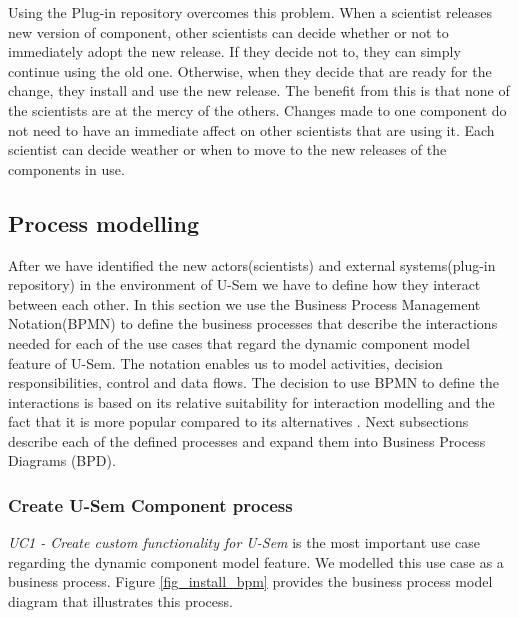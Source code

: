 Using the Plug-in repository overcomes this problem. When a scientist releases new version of component, other scientists can decide whether or not to immediately adopt the new release. If they decide not to, they can simply continue using the old one. Otherwise, when they decide that are ready for the change, they install and use the new release. The benefit from this is that none of the scientists are at the mercy of the others. Changes made to one component do not need to have an immediate affect on other scientists that are using it. Each scientist can decide weather or when to move to the new releases of the components in use.


\subsection{Process modelling}

After we have identified the new actors(scientists) and external systems(plug-in repository) in the environment of U-Sem we have to define how they interact between each other. In this section we use the Business Process Management Notation(BPMN) \cite{BPMN} to define the business processes that describe the interactions needed for each of the use cases that regard the dynamic component model feature of U-Sem. The notation enables us to model activities, decision responsibilities, control and data flows. The decision to use BPMN to define the interactions is based on its relative suitability for interaction modelling and the fact that it is more popular compared to its alternatives \cite{Decker}. Next subsections describe each of the defined processes and expand them into Business Process Diagrams (BPD).

\subsubsection{Create U-Sem Component process}

\textit{UC1 - Create custom functionality for U-Sem} is the most important use case regarding the dynamic component model feature. We modelled this use case as a business process. Figure \ref{fig_install_bpm} provides the business process model diagram that illustrates this process. 

